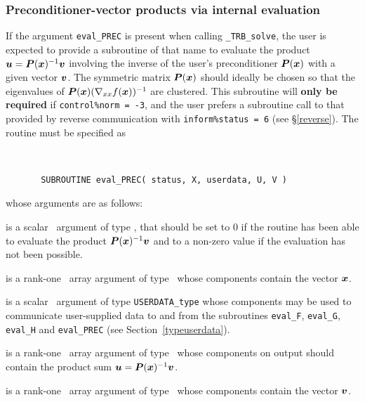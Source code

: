 \documentclass{galahad}
\newcommand{\packagename}{TRB}
\newcommand{\fullpackagename}{\libraryname\_\packagename}
\newcommand{\solver}{{\tt \fullpackagename\_solve}}
\begin{document}

\subsubsection{Preconditioner-vector products via internal evaluation\label{pv}}

If the argument {\tt eval\_PREC} is present when calling \solver, the
user is expected to provide a subroutine of that name to evaluate the
product ${\bm{u}} = {\bm{P}}({\bm{x}})^{-1} {\bm{v}}$ involving the inverse of the user's 
preconditioner ${\bm{P}}({\bm{x}})$ with a given vector ${\bm{v}}$. 
The symmetric matrix ${\bm{P}}({\bm{x}})$ should ideally be chosen so that the 
eigenvalues of ${\bm{P}}({\bm{x}}) (\nabla_{xx} f({\bm{x}}))^{-1}$ are clustered. 
This subroutine
will {\bf only be required} if {\tt control\%norm = -3}, and the user prefers
a subroutine call to that provided by reverse communication 
with {\tt inform\%status = 6} (see \S\ref{reverse}).
The routine must be specified as

\def\baselinestretch{0.8}
{\tt
\begin{verbatim}
       SUBROUTINE eval_PREC( status, X, userdata, U, V )
\end{verbatim} }
\def\baselinestretch{1.0}
\noindent whose arguments are as follows:

\begin{description}
 is a scalar \intentout\ argument of type \integer,
that should be set to 0 if the routine has been able to evaluate the
product ${\bm{P}}({\bm{x}})^{-1} {\bm{v}}$
and to a non-zero value if the evaluation has not been possible.

 is a rank-one \intentin\ array argument of type \realdp\
whose components contain the vector ${\bm{x}}$.

 is a scalar \intentinout\ argument of type
{\tt USERDATA\_type} whose components may be used
to communicate user-supplied data to and from the
subroutines {\tt eval\_F}, {\tt eval\_G},
{\tt eval\_H} and {\tt eval\_PREC}
(see Section~\ref{typeuserdata}).

 is a rank-one \intentout\ array argument of type \realdp\
whose components on output should contain the product
sum ${\bm{u}} = {\bm{P}}({\bm{x}})^{-1} {\bm{v}}$.

 is a rank-one \intentin\ array argument of type \realdp\
whose components contain the vector ${\bm{v}}$.

\end{description}
\end{document}
